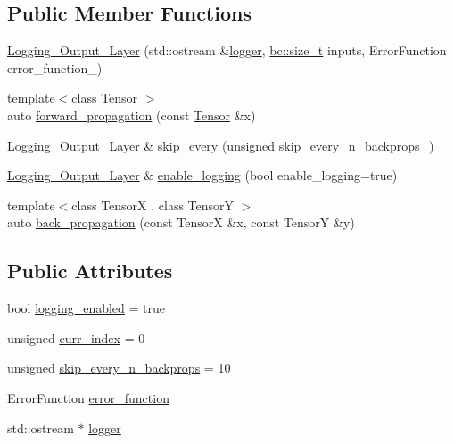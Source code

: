 \subsection*{Public Member Functions}
\begin{DoxyCompactItemize}
\item 
\hyperlink{structbc_1_1nn_1_1Logging__Output__Layer_a340a3b8698be1ed148f9c97e16731753}{Logging\+\_\+\+Output\+\_\+\+Layer} (std\+::ostream \&\hyperlink{structbc_1_1nn_1_1Logging__Output__Layer_acca4ad9c516221a5cc62cedf86e48ad1}{logger}, \hyperlink{namespacebc_aaf8e3fbf99b04b1b57c4f80c6f55d3c5}{bc\+::size\+\_\+t} inputs, Error\+Function error\+\_\+function\+\_\+)
\item 
{\footnotesize template$<$class Tensor $>$ }\\auto \hyperlink{structbc_1_1nn_1_1Logging__Output__Layer_a1462b0431b1b033ebb3e75f6fb90c865}{forward\+\_\+propagation} (const \hyperlink{namespacebc_a659391e47ab612be3ba6c18cf9c89159}{Tensor} \&x)
\item 
\hyperlink{structbc_1_1nn_1_1Logging__Output__Layer}{Logging\+\_\+\+Output\+\_\+\+Layer} \& \hyperlink{structbc_1_1nn_1_1Logging__Output__Layer_ae71754132dbdde7afd6658651140d0ba}{skip\+\_\+every} (unsigned skip\+\_\+every\+\_\+n\+\_\+backprops\+\_\+)
\item 
\hyperlink{structbc_1_1nn_1_1Logging__Output__Layer}{Logging\+\_\+\+Output\+\_\+\+Layer} \& \hyperlink{structbc_1_1nn_1_1Logging__Output__Layer_a7d2a157ebe7f1626cba1e4007828a11a}{enable\+\_\+logging} (bool enable\+\_\+logging=true)
\item 
{\footnotesize template$<$class TensorX , class TensorY $>$ }\\auto \hyperlink{structbc_1_1nn_1_1Logging__Output__Layer_aed0550f4b95ebea0fe4182d316cf58ef}{back\+\_\+propagation} (const TensorX \&x, const TensorY \&y)
\end{DoxyCompactItemize}
\subsection*{Public Attributes}
\begin{DoxyCompactItemize}
\item 
bool \hyperlink{structbc_1_1nn_1_1Logging__Output__Layer_a75fbe8edf25c7acbf1750a79f6beaaf3}{logging\+\_\+enabled} = true
\item 
unsigned \hyperlink{structbc_1_1nn_1_1Logging__Output__Layer_a46ff3180b1082cf438a0d0b8316942cd}{curr\+\_\+index} = 0
\item 
unsigned \hyperlink{structbc_1_1nn_1_1Logging__Output__Layer_a112dfc7bcd55a2e1691ab29c4894ae70}{skip\+\_\+every\+\_\+n\+\_\+backprops} = 10
\item 
Error\+Function \hyperlink{structbc_1_1nn_1_1Logging__Output__Layer_a26d5a94a63c60b17e5c9f96e87976775}{error\+\_\+function}
\item 
std\+::ostream $\ast$ \hyperlink{structbc_1_1nn_1_1Logging__Output__Layer_acca4ad9c516221a5cc62cedf86e48ad1}{logger}
\end{DoxyCompactItemize}
